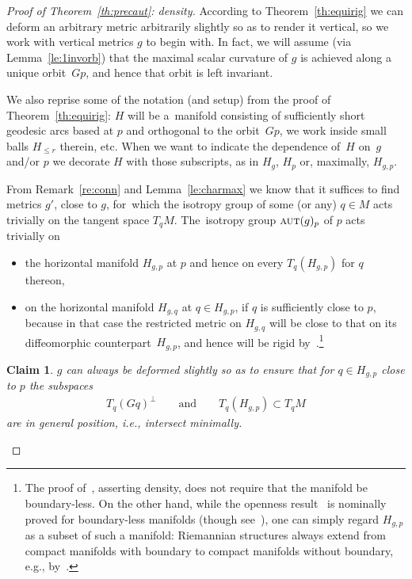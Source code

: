 \documentclass[10pt,a4paper]{amsart}
\numberwithin{equation}{section}
\newtheorem{Claim}[Theorem]{Claim}
 { \theoremstyle{definition}
\newtheorem{Definition}[Theorem]{Definition}
\newtheorem{Note}[Theorem]{Note}
\newtheorem{Example}[Theorem]{Example}
\newtheorem{Notation}[Theorem]{Notation}
\newtheorem{Remark}[Theorem]{Remark} }
\newcommand{\cat}[1]{\textsc{#1}}
\begin{document}
\begin{proof}[Proof of Theorem~\ref{th:precaut}: density]
 According to Theorem~\ref{th:equirig} we can deform an arbitrary metric arbitrarily slightly so as to render it vertical, so we work with vertical metrics $g$ to begin with. In fact, we will assume (via Lemma~\ref{le:1invorb}) that the maximal scalar curvature of $g$ is achieved along a unique orbit~$Gp$, and hence that orbit is left invariant.

 We also reprise some of the notation (and setup) from the proof of Theorem~\ref{th:equirig}: $H$ will be a~manifold consisting of sufficiently short geodesic arcs based at $p$ and orthogonal to the orbit~$Gp$, we work inside small balls $H_{\le r}$ therein, etc. When we want to indicate the dependence of~$H$ on~$g$ and/or $p$ we decorate $H$ with those subscripts, as in $H_g$, $H_p$ or, maximally, $H_{g,p}$.

 From Remark~\ref{re:conn} and Lemma~\ref{le:charmax} we know that it suffices to find metrics $g'$, close to $g$, for~which the isotropy group of some (or any) $q\in M$ acts trivially on the tangent space $T_qM$. The~isotropy group $\cat{aut}(g)_p$ of $p$ acts trivially on
 \begin{itemize}\itemsep=0pt
 \item the horizontal manifold $H_{g,p}$ at $p$ and hence on every $T_q(H_{g,p})$ for $q$ thereon,
 \item on the horizontal manifold $H_{g,q}$ at $q\in H_{g,p}$, if $q$ is sufficiently close to $p$, because in that case the restricted metric on $H_{g,q}$ will be close to that on its diffeomorphic counterpart~$H_{g,p}$, and hence will be rigid by~\cite[Corollary~8.2 and Proposition~8.3]{eb}.\footnote{The proof of~\cite[Proposition~8.3]{eb}, asserting density, does not require that the manifold be boundary-less. On the other hand, while the openness result~\cite[Corollary~8.2]{eb} is nominally proved for boundary-less manifolds (though see~\cite[p.~11, footnote~3]{eb}), one can simply regard $H_{g,p}$ as a subset of such a manifold: Riemannian structures always extend from compact manifolds with boundary to compact manifolds without boundary, e.g., by~\cite[Theorem~A]{pv}.}
 \end{itemize}

 \begin{Claim}
 $g$ can always be deformed slightly so as to ensure that for $q\in H_{g,p}$ close to $p$ the subspaces
 \begin{gather}\label{eq:2sp}
 T_q(Gq)^{\perp}\qquad\text{and}\qquad T_q(H_{g,p})\subset T_qM
 \end{gather}
 are in general position, i.e., intersect minimally.
 \end{Claim}


\end{proof}
\end{document}
